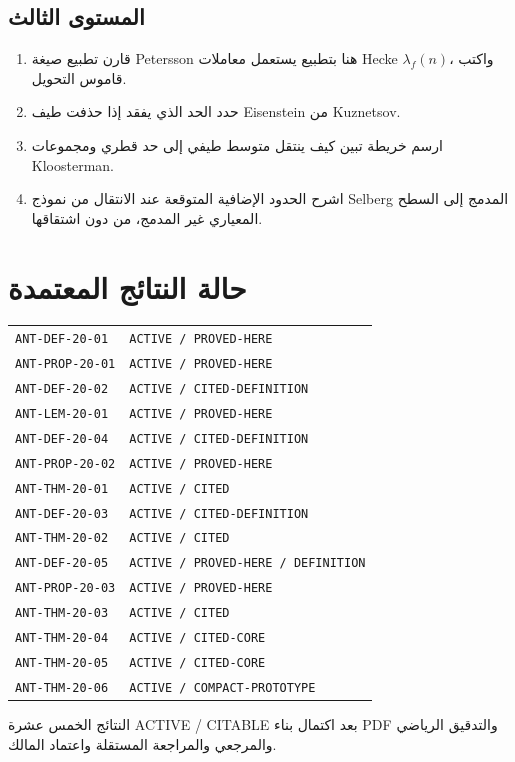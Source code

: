 \subsection{المستوى الثالث}
\begin{enumerate}
  \item قارن تطبيع صيغة Petersson هنا بتطبيع يستعمل معاملات Hecke
  \(\lambda_f(n)\)، واكتب قاموس التحويل.
  \item حدد الحد الذي يفقد إذا حذفت طيف Eisenstein من Kuznetsov.
  \item ارسم خريطة تبين كيف ينتقل متوسط طيفي إلى حد قطري ومجموعات
  Kloosterman.
  \item اشرح الحدود الإضافية المتوقعة عند الانتقال من نموذج Selberg
  المدمج إلى السطح المعياري غير المدمج، من دون اشتقاقها.
\end{enumerate}

\section*{حالة النتائج المعتمدة}

\begin{center}
\begin{tabular}{ll}
\textenglish{\texttt{ANT-DEF-20-01}} & \textenglish{\texttt{ACTIVE / PROVED-HERE}}\\
\textenglish{\texttt{ANT-PROP-20-01}} & \textenglish{\texttt{ACTIVE / PROVED-HERE}}\\
\textenglish{\texttt{ANT-DEF-20-02}} & \textenglish{\texttt{ACTIVE / CITED-DEFINITION}}\\
\textenglish{\texttt{ANT-LEM-20-01}} & \textenglish{\texttt{ACTIVE / PROVED-HERE}}\\
\textenglish{\texttt{ANT-DEF-20-04}} & \textenglish{\texttt{ACTIVE / CITED-DEFINITION}}\\
\textenglish{\texttt{ANT-PROP-20-02}} & \textenglish{\texttt{ACTIVE / PROVED-HERE}}\\
\textenglish{\texttt{ANT-THM-20-01}} & \textenglish{\texttt{ACTIVE / CITED}}\\
\textenglish{\texttt{ANT-DEF-20-03}} & \textenglish{\texttt{ACTIVE / CITED-DEFINITION}}\\
\textenglish{\texttt{ANT-THM-20-02}} & \textenglish{\texttt{ACTIVE / CITED}}\\
\textenglish{\texttt{ANT-DEF-20-05}} & \textenglish{\texttt{ACTIVE / PROVED-HERE / DEFINITION}}\\
\textenglish{\texttt{ANT-PROP-20-03}} & \textenglish{\texttt{ACTIVE / PROVED-HERE}}\\
\textenglish{\texttt{ANT-THM-20-03}} & \textenglish{\texttt{ACTIVE / CITED}}\\
\textenglish{\texttt{ANT-THM-20-04}} & \textenglish{\texttt{ACTIVE / CITED-CORE}}\\
\textenglish{\texttt{ANT-THM-20-05}} & \textenglish{\texttt{ACTIVE / CITED-CORE}}\\
\textenglish{\texttt{ANT-THM-20-06}} & \textenglish{\texttt{ACTIVE / COMPACT-PROTOTYPE}}
\end{tabular}
\end{center}

النتائج الخمس عشرة \textenglish{ACTIVE / CITABLE} بعد اكتمال بناء PDF
والتدقيق الرياضي والمرجعي والمراجعة المستقلة واعتماد المالك.

